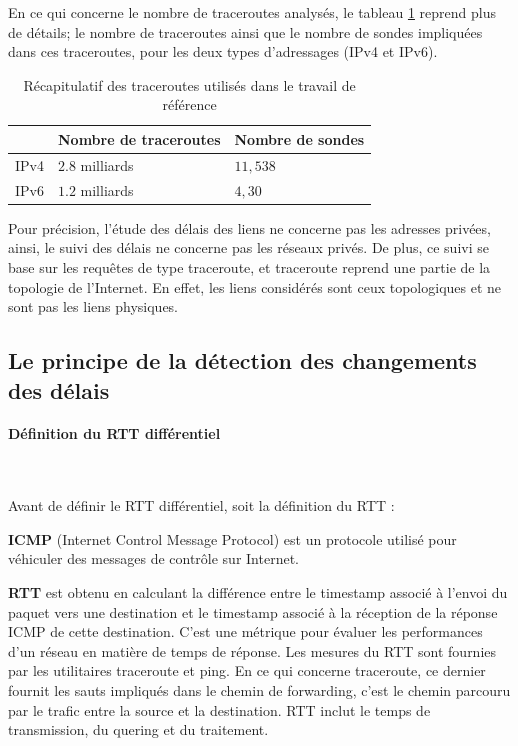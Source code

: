 En ce qui concerne le nombre de  traceroutes analysés, le tableau \ref{tab:dataset} reprend plus de détails; le nombre de traceroutes ainsi que le nombre de sondes impliquées dans ces traceroutes, pour les deux types d'adressages (IPv4 et IPv6). 

\begin{table}[H]
	\centering
	\begin{tabular}{|l|l|l|}
		\hline
		& \textbf{Nombre de traceroute}s& \textbf{Nombre de sondes}\\ \hline
		IPv4		&$ 2.8 $ milliards & $ 11,538 $\\ \hline
		IPv6	&	$ 1.2 $ milliards & $ 4,30 $ \\ \hline
	\end{tabular}
	\caption{Récapitulatif des traceroutes utilisés dans le travail de référence }
	\label{tab:dataset}
\end{table}


Pour précision, l'étude des délais des liens ne concerne pas  les adresses privées, ainsi, le suivi des délais ne concerne pas les réseaux privés.  De plus, ce  suivi  se base sur les requêtes de type traceroute, et traceroute reprend une partie de la topologie de l'Internet. En effet, les liens considérés sont ceux topologiques et ne sont pas  les liens physiques. 

\subsection{Le principe de la détection des changements des délais} \label{principe-de-detection}
\paragraph{Définition du RTT différentiel }~

Avant de définir le RTT différentiel, soit la définition du RTT :


\begin{tcolorbox}
	
	\textbf{ICMP} (Internet Control Message Protocol) est un protocole utilisé pour véhiculer des messages de contrôle sur Internet.
	
	\textbf{RTT} est obtenu en calculant la différence entre le timestamp associé à l'envoi du paquet vers une destination  et le timestamp associé à la réception de la réponse ICMP de cette destination. C'est une métrique pour évaluer les performances d'un réseau en matière de temps de réponse. Les mesures du RTT sont fournies par les utilitaires traceroute et ping. En ce qui concerne traceroute,  ce dernier fournit les sauts impliqués dans le  chemin de forwarding, c'est le chemin parcouru par le trafic entre la source et la destination.  RTT inclut le temps de transmission, du quering et  du traitement. 
\end{tcolorbox}


